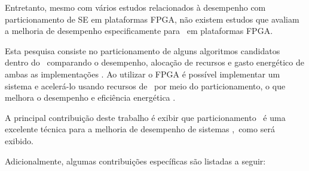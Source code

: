     
    
    Entretanto, mesmo com vários estudos relacionados à desempenho com particionamento de SE em plataformas FPGA, não existem estudos que avaliam a melhoria de desempenho especificamente para \wearables\ em plataformas FPGA.
    
    
    
    Esta pesquisa consiste no particionamento de alguns algoritmos candidatos dentro do \wearable\ comparando o desempenho, alocação de recursos e gasto energético de ambas as implementações \hs.
    Ao utilizar o FPGA é possível implementar um sistema e acelerá-lo usando recursos de \hardware\ por meio do particionamento, o que melhora o desempenho e eficiência energética \cite{Cong2009, Lo2009, Zhang2008a}.
    
    
    A principal contribuição deste trabalho é exibir que particionamento \hs\ é uma excelente técnica para a melhoria de desempenho de sistemas \wearables,\ como será exibido.
    
    Adicionalmente, algumas contribuições específicas são listadas a seguir:
    
